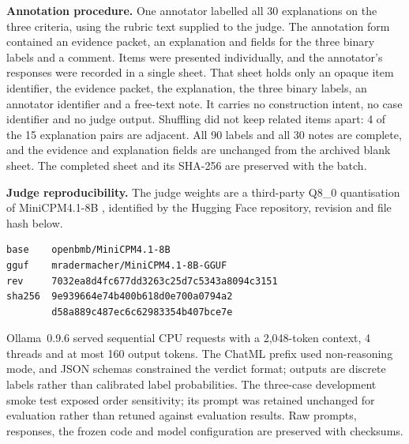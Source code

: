 \textbf{Annotation procedure.}
One annotator labelled all 30 explanations on the three criteria, using the rubric text supplied to the judge.
The annotation form contained an evidence packet, an explanation and fields for the three binary labels and a comment.
Items were presented individually, and the annotator's responses were recorded in a single sheet.
That sheet holds only an opaque item identifier, the evidence packet, the explanation, the three binary labels, an annotator identifier and a free-text note.
It carries no construction intent, no case identifier and no judge output.
Shuffling did not keep related items apart: 4 of the 15 explanation pairs are adjacent.
All 90 labels and all 30 notes are complete, and the evidence and explanation fields are unchanged from the archived blank sheet.
The completed sheet and its SHA-256 are preserved with the batch.

\textbf{Judge reproducibility.}
The judge weights are a third-party Q8\_0 quantisation of MiniCPM4.1-8B \cite{openbmb2025minicpm41}, identified by the Hugging Face repository, revision and file hash below.
\begingroup
\footnotesize
\noindent\begin{minipage}{\columnwidth}
\begin{verbatim}
base    openbmb/MiniCPM4.1-8B
gguf    mradermacher/MiniCPM4.1-8B-GGUF
rev     7032ea8d4fc677dd3263c25d7c5343a8094c3151
sha256  9e939664e74b400b618d0e700a0794a2
        d58a889c487ec6c62983354b407bce7e
\end{verbatim}
\end{minipage}
\endgroup
\par\smallskip
\noindent Ollama~0.9.6 \cite{ollama2025} served sequential CPU requests with a 2{,}048-token context, 4 threads and at most 160 output tokens.
The ChatML prefix used non-reasoning mode, and JSON schemas constrained the verdict format; outputs are discrete labels rather than calibrated label probabilities.
The three-case development smoke test exposed order sensitivity; its prompt was retained unchanged for evaluation rather than retuned against evaluation results.
Raw prompts, responses, the frozen code and model configuration are preserved with checksums.
